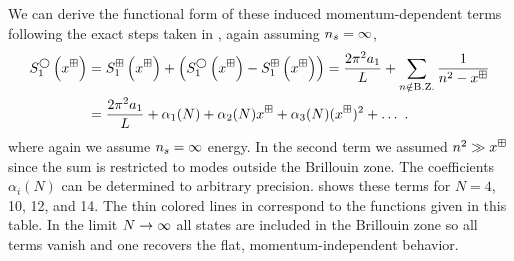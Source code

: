 We can derive the functional form of these induced momentum-dependent terms following the exact steps taken in , again assuming ${n_s}=\infty$,
\begin{align*}
S^\bigcirc_{1}\left(x^\dispersion\right)&=S^{\dispersion}_{1}\left(x^\dispersion\right)+\left(S^\bigcirc_{1}\left(x^\dispersion\right)  -S^{\dispersion}_{1}\left(x^\dispersion\right)\right) %
=\frac{2\pi^2 a_{1}}{L}+ \sum_{n\notin \operatorname{B.Z.}} \frac{1}{n^{2}-x^\dispersion} \\
&=\frac{2\pi^2 a_{1}}{L}+\alpha_1(N)+ \alpha_2(N)x^\dispersion+\alpha_3(N)(x^\dispersion)^2+\ldots\ .
\end{align*}
where again we assume ${n_s}=\infty$ energy.
In the second term we assumed $n^2\gg x^\boxplus$ since the sum is restricted to modes outside the Brillouin zone.
The coefficients $\alpha_i(N)$ can be determined to arbitrary precision.
 shows these terms for $N=4$, 10, 12, and 14.
The thin colored lines in  correspond to the functions given in this table.
In the limit $N\rightarrow\infty$ all states are included in the Brillouin zone so all terms vanish and one recovers the flat, momentum-independent behavior.

